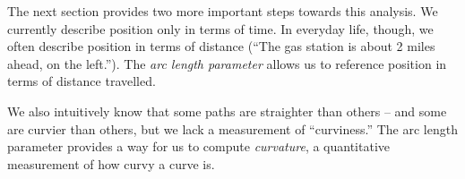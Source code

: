 The next section provides two more important steps towards this analysis. %
We currently describe position only in terms of time. In everyday life, though, we often describe position in terms of distance (``The gas station is about 2 miles ahead, on the left.''). The \emph{arc length parameter} allows us to reference position in terms of distance travelled. 

We also intuitively know that some paths are straighter than others -- and some are curvier than others, but we lack a measurement of ``curviness.'' The arc length parameter provides a way for us to compute \emph{curvature}, a quantitative measurement of how curvy a curve is.

